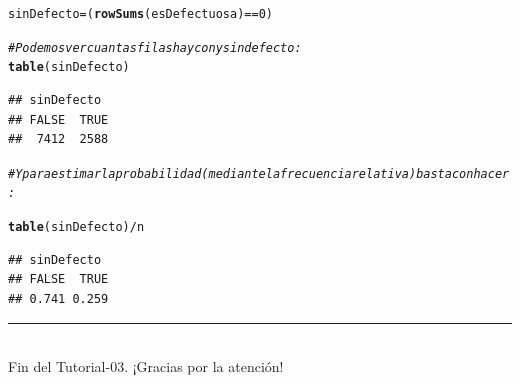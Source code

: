 \documentclass[10pt,a4paper]{article}\usepackage[]{graphicx}\usepackage[]{color}
\makeatletter
\newcommand{\hlnum}[1]{\textcolor[rgb]{0.686,0.059,0.569}{#1}}%
\newcommand{\hlcom}[1]{\textcolor[rgb]{0.678,0.584,0.686}{\textit{#1}}}%
\newcommand{\hlopt}[1]{\textcolor[rgb]{0,0,0}{#1}}%
\newcommand{\hlstd}[1]{\textcolor[rgb]{0.345,0.345,0.345}{#1}}%
\newcommand{\hlkwb}[1]{\textcolor[rgb]{0.69,0.353,0.396}{#1}}%
\newcommand{\hlkwd}[1]{\textcolor[rgb]{0.737,0.353,0.396}{\textbf{#1}}}%
\newenvironment{kframe}{%
 \def\at@end@of@kframe{}%
 \ifinner\ifhmode%
  \def\at@end@of@kframe{\end{minipage}}%
  \begin{minipage}{\columnwidth}%
 \fi\fi%
 \def\FrameCommand##1{\hskip\@totalleftmargin \hskip-\fboxsep
 \colorbox{shadecolor}{##1}\hskip-\fboxsep
     \hskip-\linewidth \hskip-\@totalleftmargin \hskip\columnwidth}%
 \MakeFramed {\advance\hsize-\width
   \@totalleftmargin\z@ \linewidth\hsize
   \@setminipage}}%
 {\par\unskip\endMakeFramed%
 \at@end@of@kframe}
\newenvironment{knitrout}{}{} %
\newcounter {cont01}
\makeatother
\begin{document}
\begin{knitrout}
\begin{kframe}
\begin{alltt}
\hlstd{sinDefecto} \hlkwb{=} \hlstd{(}\hlkwd{rowSums}\hlstd{(esDefectuosa)} \hlopt{==} \hlnum{0}\hlstd{)}

\hlcom{# Podemos ver cuantas filas hay con y sin defecto:}
\hlkwd{table}\hlstd{(sinDefecto)}
\end{alltt}
\begin{verbatim}
## sinDefecto
## FALSE  TRUE 
##  7412  2588
\end{verbatim}
\begin{alltt}
\hlcom{# Y para estimar la probabilidad (mediante la frecuencia relativa) basta con hacer:}

\hlkwd{table}\hlstd{(sinDefecto)} \hlopt{/} \hlstd{n}
\end{alltt}
\begin{verbatim}
## sinDefecto
## FALSE  TRUE 
## 0.741 0.259
\end{verbatim}
\end{kframe}
\end{knitrout}



\vspace{2cm} \hrule
\quad\\
Fin del Tutorial-03. ¡Gracias por la atención!


%
%
\end{document}
